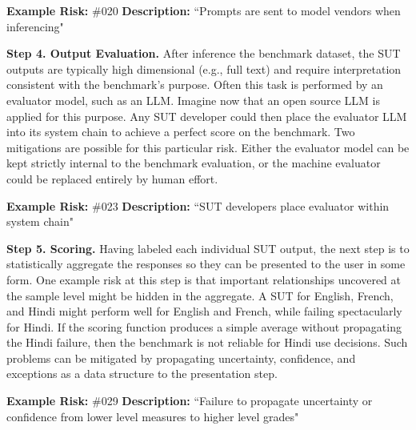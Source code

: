 \documentclass{article}
\begin{document}
\begin{center}
    \begin{tcolorbox}[colback=gray!10, colframe=black!50, width=\textwidth, boxrule=0.5mm, sharp corners, coltext=black]
        {\bf Example Risk:} \#020
        \newline
        {\bf Description:} ``Prompts are sent to model vendors when inferencing"
    \end{tcolorbox}
\end{center}

{\bf Step 4. Output Evaluation.} After inference the benchmark dataset, the SUT outputs are typically high dimensional (e.g., full text) and require interpretation consistent with the benchmark's purpose. Often this task is performed by an evaluator model, such as an LLM. Imagine now that an open source LLM is applied for this purpose. Any SUT developer could then place the evaluator LLM into its system chain to achieve a perfect score on the benchmark. Two mitigations are possible for this particular risk. Either the evaluator model can be kept strictly internal to the benchmark evaluation, or the machine evaluator could be replaced entirely by human effort.

\begin{center}
    \begin{tcolorbox}[colback=gray!10, colframe=black!50, width=\textwidth, boxrule=0.5mm, sharp corners, coltext=black]
        {\bf Example Risk:} \#023
        \newline
        {\bf Description:} ``SUT developers place evaluator within system chain"
    \end{tcolorbox}
\end{center}

{\bf Step 5. Scoring.} Having labeled each individual SUT output, the next step is to statistically aggregate the responses so they can be presented to the user in some form. One example risk at this step is that important relationships uncovered at the sample level might be hidden in the aggregate. A SUT for English, French, and Hindi might perform well for English and French, while failing spectacularly for Hindi. If the scoring function produces a simple average without propagating the Hindi failure, then the benchmark is not reliable for Hindi use decisions. Such problems can be mitigated by propagating uncertainty, confidence, and exceptions as a data structure to the presentation step.

\begin{center}
    \begin{tcolorbox}[colback=gray!10, colframe=black!50, width=\textwidth, boxrule=0.5mm, sharp corners, coltext=black]
        {\bf Example Risk:} \#029
        \newline
        {\bf Description:} ``Failure to propagate uncertainty or confidence from lower level measures to higher level grades"
    \end{tcolorbox}
\end{center}
\end{document}
